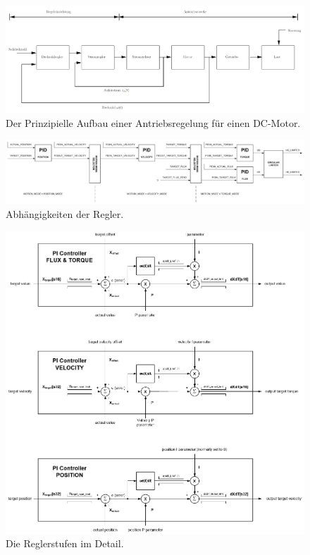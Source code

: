 \begin{figure}[h!]
	\centering
	\includegraphics[width=\textwidth]{graphics/Prinzipieller_Antrieb_DC_Motor.png}
	\caption{Der Prinzipielle Aufbau einer Antriebsregelung für einen DC-Motor. 
	\cite{prof_dr-ing_raisch_stromregelung_nodate}
	}
	\label{fig:Blockdiagramm_TMC4671_PID_0}
\end{figure}

\begin{figure}[h!]
	\centering
	\includegraphics[width=\textwidth]{graphics/PI_Regler_Struktur_Gesamt.png}
	\caption{Abhängigkeiten der Regler.\cite{trinamic_datasheet_2018}}
	\label{fig:Blockdiagramm_TMC4671_PID_1}
\end{figure}

\newpage

\begin{figure}[h!]
	\centering
	\includegraphics[width=\textwidth]{graphics/PI_Regler_Struktur.png}
	\caption{Die Reglerstufen im Detail. \cite{trinamic_datasheet_2018}}
	\label{fig:Blockdiagramm_TMC4671_PID_2}
\end{figure}

